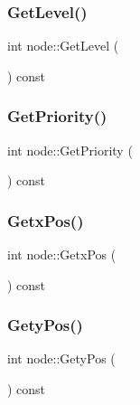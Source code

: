 \mbox{\label{classnode_a8f168b85b9bdf0a837f5070e5af6f009}} 
\subsubsection{\texorpdfstring{Get\+Level()}{GetLevel()}}
{\footnotesize\ttfamily int node\+::\+Get\+Level (\begin{DoxyParamCaption}{ }\end{DoxyParamCaption}) const\hspace{0.3cm}{\ttfamily [inline]}}

\mbox{\label{classnode_afa8c64a3cf2d61348b69b7e68233aa8d}} 
\subsubsection{\texorpdfstring{Get\+Priority()}{GetPriority()}}
{\footnotesize\ttfamily int node\+::\+Get\+Priority (\begin{DoxyParamCaption}{ }\end{DoxyParamCaption}) const\hspace{0.3cm}{\ttfamily [inline]}}

\mbox{\label{classnode_a32e22b8a1fb6be6efa7348cc848600cf}} 
\subsubsection{\texorpdfstring{Getx\+Pos()}{GetxPos()}}
{\footnotesize\ttfamily int node\+::\+Getx\+Pos (\begin{DoxyParamCaption}{ }\end{DoxyParamCaption}) const\hspace{0.3cm}{\ttfamily [inline]}}

\mbox{\label{classnode_a0d644ed02899013bdc6e222afefb4c25}} 
\subsubsection{\texorpdfstring{Gety\+Pos()}{GetyPos()}}
{\footnotesize\ttfamily int node\+::\+Gety\+Pos (\begin{DoxyParamCaption}{ }\end{DoxyParamCaption}) const\hspace{0.3cm}{\ttfamily [inline]}}

